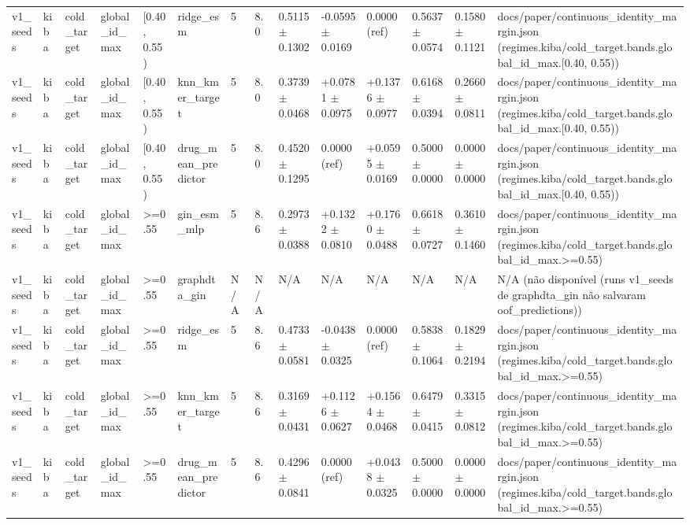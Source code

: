 \begin{table}[htbp]
\begin{tabular}{llllllllllllll}
v1\_seeds & kiba & cold\_target & global\_id\_max & [0.40, 0.55) & ridge\_esm & 5 & 8.0 & 0.5115 $\pm$ 0.1302 & -0.0595 $\pm$ 0.0169 & 0.0000 (ref) & 0.5637 $\pm$ 0.0574 & 0.1580 $\pm$ 0.1121 & docs/paper/continuous\_identity\_margin.json (regimes.kiba/cold\_target.bands.global\_id\_max.[0.40, 0.55)) \\
v1\_seeds & kiba & cold\_target & global\_id\_max & [0.40, 0.55) & knn\_kmer\_target & 5 & 8.0 & 0.3739 $\pm$ 0.0468 & +0.0781 $\pm$ 0.0975 & +0.1376 $\pm$ 0.0977 & 0.6168 $\pm$ 0.0394 & 0.2660 $\pm$ 0.0811 & docs/paper/continuous\_identity\_margin.json (regimes.kiba/cold\_target.bands.global\_id\_max.[0.40, 0.55)) \\
v1\_seeds & kiba & cold\_target & global\_id\_max & [0.40, 0.55) & drug\_mean\_predictor & 5 & 8.0 & 0.4520 $\pm$ 0.1295 & 0.0000 (ref) & +0.0595 $\pm$ 0.0169 & 0.5000 $\pm$ 0.0000 & 0.0000 $\pm$ 0.0000 & docs/paper/continuous\_identity\_margin.json (regimes.kiba/cold\_target.bands.global\_id\_max.[0.40, 0.55)) \\
v1\_seeds & kiba & cold\_target & global\_id\_max & >=0.55 & gin\_esm\_mlp & 5 & 8.6 & 0.2973 $\pm$ 0.0388 & +0.1322 $\pm$ 0.0810 & +0.1760 $\pm$ 0.0488 & 0.6618 $\pm$ 0.0727 & 0.3610 $\pm$ 0.1460 & docs/paper/continuous\_identity\_margin.json (regimes.kiba/cold\_target.bands.global\_id\_max.>=0.55) \\
v1\_seeds & kiba & cold\_target & global\_id\_max & >=0.55 & graphdta\_gin & N/A & N/A & N/A & N/A & N/A & N/A & N/A & N/A (não disponível (runs v1\_seeds de graphdta\_gin não salvaram oof\_predictions)) \\
v1\_seeds & kiba & cold\_target & global\_id\_max & >=0.55 & ridge\_esm & 5 & 8.6 & 0.4733 $\pm$ 0.0581 & -0.0438 $\pm$ 0.0325 & 0.0000 (ref) & 0.5838 $\pm$ 0.1064 & 0.1829 $\pm$ 0.2194 & docs/paper/continuous\_identity\_margin.json (regimes.kiba/cold\_target.bands.global\_id\_max.>=0.55) \\
v1\_seeds & kiba & cold\_target & global\_id\_max & >=0.55 & knn\_kmer\_target & 5 & 8.6 & 0.3169 $\pm$ 0.0431 & +0.1126 $\pm$ 0.0627 & +0.1564 $\pm$ 0.0468 & 0.6479 $\pm$ 0.0415 & 0.3315 $\pm$ 0.0812 & docs/paper/continuous\_identity\_margin.json (regimes.kiba/cold\_target.bands.global\_id\_max.>=0.55) \\
v1\_seeds & kiba & cold\_target & global\_id\_max & >=0.55 & drug\_mean\_predictor & 5 & 8.6 & 0.4296 $\pm$ 0.0841 & 0.0000 (ref) & +0.0438 $\pm$ 0.0325 & 0.5000 $\pm$ 0.0000 & 0.0000 $\pm$ 0.0000 & docs/paper/continuous\_identity\_margin.json (regimes.kiba/cold\_target.bands.global\_id\_max.>=0.55) \\

\end{tabular}
\end{table}
